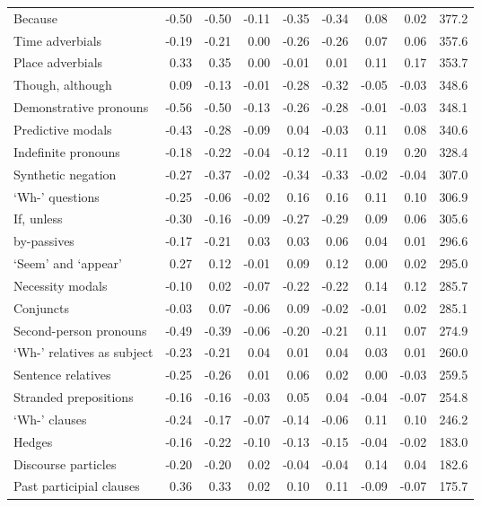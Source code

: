 \begin{table}[!t]
\begin{tabular*}{\linewidth}{@{\extracolsep{\fill}}lrrrrrrrr}
Because & -0.50 & -0.50 & -0.11 & -0.35 & -0.34 & 0.08 & 0.02 & 377.2 \\ 
Time adverbials & -0.19 & -0.21 & 0.00 & -0.26 & -0.26 & 0.07 & 0.06 & 357.6 \\ 
Place adverbials & 0.33 & 0.35 & 0.00 & -0.01 & 0.01 & 0.11 & 0.17 & 353.7 \\ 
Though, although & 0.09 & -0.13 & -0.01 & -0.28 & -0.32 & -0.05 & -0.03 & 348.6 \\ 
Demonstrative pronouns & -0.56 & -0.50 & -0.13 & -0.26 & -0.28 & -0.01 & -0.03 & 348.1 \\ 
Predictive modals & -0.43 & -0.28 & -0.09 & 0.04 & -0.03 & 0.11 & 0.08 & 340.6 \\ 
Indefinite pronouns & -0.18 & -0.22 & -0.04 & -0.12 & -0.11 & 0.19 & 0.20 & 328.4 \\ 
Synthetic negation & -0.27 & -0.37 & -0.02 & -0.34 & -0.33 & -0.02 & -0.04 & 307.0 \\ 
‘Wh-’ questions & -0.25 & -0.06 & -0.02 & 0.16 & 0.16 & 0.11 & 0.10 & 306.9 \\ 
If, unless & -0.30 & -0.16 & -0.09 & -0.27 & -0.29 & 0.09 & 0.06 & 305.6 \\ 
by-passives & -0.17 & -0.21 & 0.03 & 0.03 & 0.06 & 0.04 & 0.01 & 296.6 \\ 
‘Seem’ and ‘appear’ & 0.27 & 0.12 & -0.01 & 0.09 & 0.12 & 0.00 & 0.02 & 295.0 \\ 
Necessity modals & -0.10 & 0.02 & -0.07 & -0.22 & -0.22 & 0.14 & 0.12 & 285.7 \\ 
Conjuncts & -0.03 & 0.07 & -0.06 & 0.09 & -0.02 & -0.01 & 0.02 & 285.1 \\ 
Second-person pronouns & -0.49 & -0.39 & -0.06 & -0.20 & -0.21 & 0.11 & 0.07 & 274.9 \\ 
‘Wh-’ relatives as subject & -0.23 & -0.21 & 0.04 & 0.01 & 0.04 & 0.03 & 0.01 & 260.0 \\ 
Sentence relatives & -0.25 & -0.26 & 0.01 & 0.06 & 0.02 & 0.00 & -0.03 & 259.5 \\ 
Stranded prepositions & -0.16 & -0.16 & -0.03 & 0.05 & 0.04 & -0.04 & -0.07 & 254.8 \\ 
‘Wh-’ clauses & -0.24 & -0.17 & -0.07 & -0.14 & -0.06 & 0.11 & 0.10 & 246.2 \\ 
Hedges & -0.16 & -0.22 & -0.10 & -0.13 & -0.15 & -0.04 & -0.02 & 183.0 \\ 
Discourse particles & -0.20 & -0.20 & 0.02 & -0.04 & -0.04 & 0.14 & 0.04 & 182.6 \\ 
Past participial clauses & 0.36 & 0.33 & 0.02 & 0.10 & 0.11 & -0.09 & -0.07 & 175.7 \\ 

\end{tabular*}
\end{table}
